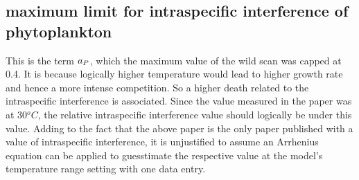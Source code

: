 \documentclass[../thesis.tex]{subfiles} %
\begin{document}
\subsection{maximum limit for intraspecific interference of phytoplankton}
This is the term $a_P$, which the maximum value of the wild scan was capped at 0.4.\autocite{de2007biofixation}  It is because logically higher temperature would lead to higher growth rate and hence a more intense competition.  So a higher death related to the intraspecific interference is associated.  Since the value measured in the paper was at 30$^oC$, the relative intraspecific interference value should logically be under this value.  Adding to the fact that the above paper is the only paper published with a value of intraspecific interference, it is unjustified to assume an Arrhenius equation can be applied to guesstimate the respective value at the model's temperature range setting with one data entry.
\end{document}
